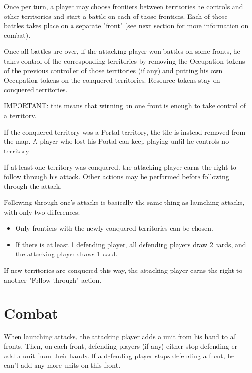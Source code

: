 \documentclass[a4paper]{article}
\begin{document}
    Once per turn, a player may choose frontiers between territories he controls and other territories and
    start a battle on each of those frontiers.
    Each of those battles takes place on a separate "front" (see next section for more information on combat).

    Once all battles are over, if the attacking player won battles on some fronts, he takes control of
    the corresponding territories by removing the Occupation tokens of the previous controller of those territories (if any)
    and putting his own Occupation tokens on the conquered territories.
    Resource tokens stay on conquered territories.
    
    IMPORTANT: this means that winning on one front is enough to take control of a territory.

    If the conquered territory was a Portal territory, the tile is instead removed from the map.
    A player who lost his Portal can keep playing until he controls no territory.

    If at least one territory was conquered, the attacking player earns the right to follow through his attack.
    Other actions may be performed before following through the attack.

    Following through one's attacks is basically the same thing as launching attacks, with only two differences:

    \begin{itemize}
        \item Only frontiers with the newly conquered territories can be chosen.
        \item If there is at least 1 defending player, all defending players draw 2 cards, and the attacking player draws 1 card.
    \end{itemize}

    If new territories are conquered this way, the attacking player earns the right to another "Follow through" action.



\section{Combat}

    When launching attacks, the attacking player adds a unit from his hand to all fronts.
    Then, on each front, defending players (if any) either stop defending or add a unit from their hands.
    If a defending player stops defending a front, he can't add any more units on this front.
    
\end{document}
